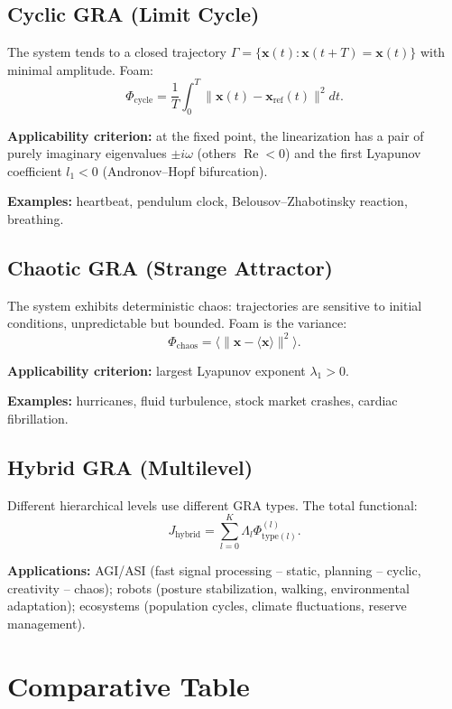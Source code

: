 \documentclass[12pt,a4paper]{article}
\begin{document}
\subsection{Cyclic GRA (Limit Cycle)}

The system tends to a closed trajectory \(\Gamma = \{\mathbf{x}(t): \mathbf{x}(t+T)=\mathbf{x}(t)\}\) with minimal amplitude. Foam:
\[
\Phi_{\text{cycle}} = \frac{1}{T}\int_0^T \|\mathbf{x}(t)-\mathbf{x}_{\text{ref}}(t)\|^2 dt.
\]

\textbf{Applicability criterion:} at the fixed point, the linearization has a pair of purely imaginary eigenvalues \(\pm i\omega\) (others \(\operatorname{Re}<0\)) and the first Lyapunov coefficient \(l_1 < 0\) (Andronov–Hopf bifurcation).

\textbf{Examples:} heartbeat, pendulum clock, Belousov–Zhabotinsky reaction, breathing.

\subsection{Chaotic GRA (Strange Attractor)}

The system exhibits deterministic chaos: trajectories are sensitive to initial conditions, unpredictable but bounded. Foam is the variance:
\[
\Phi_{\text{chaos}} = \langle \|\mathbf{x} - \langle\mathbf{x}\rangle\|^2 \rangle.
\]

\textbf{Applicability criterion:} largest Lyapunov exponent \(\lambda_1 > 0\).

\textbf{Examples:} hurricanes, fluid turbulence, stock market crashes, cardiac fibrillation.

\subsection{Hybrid GRA (Multilevel)}

Different hierarchical levels use different GRA types. The total functional:
\[
J_{\text{hybrid}} = \sum_{l=0}^K \Lambda_l \Phi_{\text{type}(l)}^{(l)}.
\]

\textbf{Applications:} AGI/ASI (fast signal processing – static, planning – cyclic, creativity – chaos); robots (posture stabilization, walking, environmental adaptation); ecosystems (population cycles, climate fluctuations, reserve management).

\section{Comparative Table}
\end{document}
